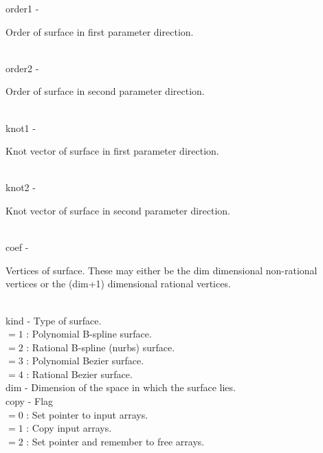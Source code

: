        \>\>    {\fov order1     } \> - \>\begin{minipg2}
                        Order of surface in first parameter direction.
                                \end{minipg2}\\
        \>\>    {\fov order2     } \> - \> \begin{minipg2}
                        Order of surface in second parameter direction.
                                \end{minipg2}\\
        \>\>    {\fov knot1    } \> - \> \begin{minipg2}
                        Knot vector of surface in first parameter direction.
                                \end{minipg2}\\
        \>\>    {\fov knot2    } \> - \> \begin{minipg2}
                        Knot vector of surface in second parameter direction.
                                \end{minipg2}\\[0.8ex]
        \>\>    {\fov coef }    \> - \> \begin{minipg2}
Vertices of surface. These may either be the {\fov dim} dimensional non-rational vertices or the {\fov (dim+1)} dimensional rational vertices.
                                \end{minipg2}\\[0.8ex]
        \>\>    {\fov kind  } \> - \> Type of surface.\\
        \>\>\>\>\>       $= 1$ :\> Polynomial B-spline surface.\\
        \>\>\>\>\>       $= 2$ :\> Rational B-spline (nurbs) surface.\\
        \>\>\>\>\>       $= 3$ :\> Polynomial Bezier surface.\\
        \>\>\>\>\>       $= 4$ :\> Rational Bezier surface.\\
        \>\>    {\fov dim   } \> - \> Dimension of the space in which the surface lies.\\
        \>\>    {\fov copy  } \> - \> Flag \\
        \>\>\>\>\>       $= 0$ :\> Set pointer to input arrays.\\
        \>\>\>\>\>       $= 1$ :\> Copy input arrays.\\
        \>\>\>\>\>       $= 2$ :\> Set pointer and remember to free arrays.\\
